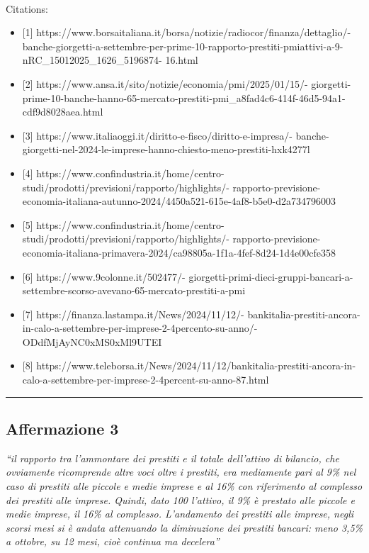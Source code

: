 \documentclass[
  letterpaper,
  DIV=11,
  numbers=noendperiod]{scrartcl}
\makeatletter
\let\oldparagraph\paragraph
\renewcommand{\paragraph}{
    \@ifstar
      \xxxParagraphStar
      \xxxParagraphNoStar
  }
\newcommand{\xxxParagraphStar}[1]{\oldparagraph*{#1}\mbox{}}
\newcommand{\xxxParagraphNoStar}[1]{\oldparagraph{#1}\mbox{}}
\providecommand{\tightlist}{%
  \setlength{\itemsep}{0pt}\setlength{\parskip}{0pt}}\usepackage{longtable,booktabs,array}
\makeatother
\begin{document}
\paragraph{Citations:}\label{citations}

\begin{itemize}
\tightlist
\item
  {[}1{]}
  https://www.borsaitaliana.it/borsa/notizie/radiocor/finanza/dettaglio/-
  banche-giorgetti-a-settembre-per-prime-10-rapporto-prestiti-pmiattivi-a-9-nRC\_15012025\_1626\_5196874-
  16.html
\item
  {[}2{]} https://www.ansa.it/sito/notizie/economia/pmi/2025/01/15/-
  giorgetti-prime-10-banche-hanno-65-mercato-prestiti-pmi\_a8fad4c6-414f-46d5-94a1-cdf9d8028aea.html
\item
  {[}3{]} https://www.italiaoggi.it/diritto-e-fisco/diritto-e-impresa/-
  banche-giorgetti-nel-2024-le-imprese-hanno-chiesto-meno-prestiti-hxk4277l
\item
  {[}4{]}
  https://www.confindustria.it/home/centro-studi/prodotti/previsioni/rapporto/highlights/-
  rapporto-previsione-economia-italiana-autunno-2024/4450a521-615e-4af8-b5e0-d2a734796003
\item
  {[}5{]}
  https://www.confindustria.it/home/centro-studi/prodotti/previsioni/rapporto/highlights/-
  rapporto-previsione-economia-italiana-primavera-2024/ca98805a-1f1a-4fef-8d24-1d4e00cfe358
\item
  {[}6{]} https://www.9colonne.it/502477/-
  giorgetti-primi-dieci-gruppi-bancari-a-settembre-scorso-avevano-65-mercato-prestiti-a-pmi
\item
  {[}7{]} https://finanza.lastampa.it/News/2024/11/12/-
  bankitalia-prestiti-ancora-in-calo-a-settembre-per-imprese-2-4percento-su-anno/-
  ODdfMjAyNC0xMS0xMl9UTEI
\item
  {[}8{]}
  https://www.teleborsa.it/News/2024/11/12/bankitalia-prestiti-ancora-in-calo-a-settembre-per-imprese-2-4percent-su-anno-87.html
\end{itemize}

\begin{center}\rule{0.5\linewidth}{0.5pt}\end{center}

\subsection{Affermazione 3}\label{affermazione-3}

\emph{``il rapporto tra l'ammontare dei prestiti e il totale dell'attivo
di bilancio, che ovviamente ricomprende altre voci oltre i prestiti, era
mediamente pari al 9\% nel caso di prestiti alle piccole e medie imprese
e al 16\% con riferimento al complesso dei prestiti alle imprese.
Quindi, dato 100 l'attivo, il 9\% è prestato alle piccole e medie
imprese, il 16\% al complesso. L'andamento dei prestiti alle imprese,
negli scorsi mesi si è andata attenuando la diminuzione dei prestiti
bancari: meno 3,5\% a ottobre, su 12 mesi, cioè continua ma decelera''}
\end{document}
